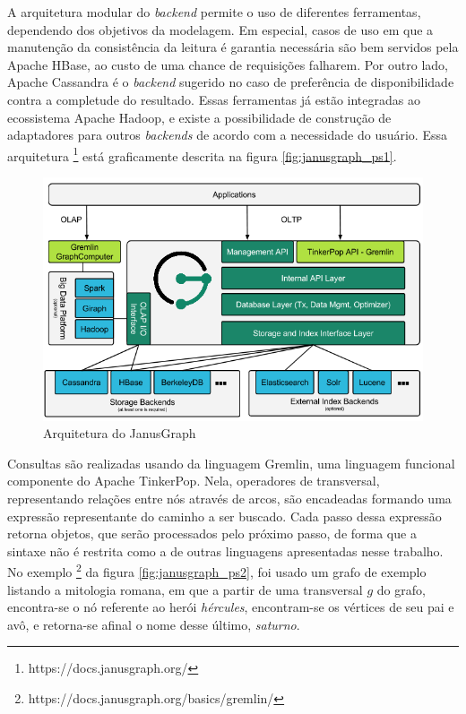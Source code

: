 \documentclass[conference]{IEEEtran}
\begin{document}
A arquitetura modular do \emph{backend} permite o uso de diferentes
ferramentas, dependendo dos objetivos da modelagem. Em especial, casos de
uso em que a manutenção da consistência da leitura é garantia necessária são
bem servidos pela Apache HBase, ao custo de uma chance de requisições
falharem. Por outro lado, Apache Cassandra é o \emph{backend} sugerido no
caso de preferência de disponibilidade contra a completude do resultado.
Essas ferramentas já estão integradas ao ecossistema Apache Hadoop, e existe
a possibilidade de construção de adaptadores para outros \emph{backends} de
acordo com a necessidade do usuário. Essa arquitetura
\footnote{https://docs.janusgraph.org/} está graficamente descrita na
figura \ref{fig:janusgraph_ps1}.

\begin{figure}[htbp]
\centerline{\includegraphics[width=0.9\linewidth]{janusgraph/janusgraph_ps1.png}}
\caption{Arquitetura do JanusGraph}\label{fig:janusgraph_ps1}
\label{fig}
\end{figure}


Consultas são realizadas usando da linguagem Gremlin, uma linguagem funcional
componente do Apache TinkerPop. Nela, operadores de transversal, representando
relações entre nós através de arcos, são encadeadas formando uma expressão
representante do caminho a ser buscado. Cada passo dessa expressão retorna
objetos, que serão processados pelo próximo passo, de forma que a sintaxe
não é restrita como a de outras linguagens apresentadas nesse trabalho. No
exemplo \footnote{https://docs.janusgraph.org/basics/gremlin/}
da figura \ref{fig:janusgraph_ps2}, foi usado um grafo de exemplo
listando a mitologia romana, em que a partir de uma transversal $g$ do grafo,
encontra-se o nó referente ao herói \emph{hércules}, encontram-se os vértices
de seu pai e avô, e retorna-se afinal o nome desse último, \emph{saturno}.
\end{document}
